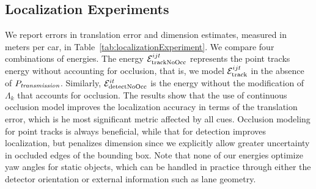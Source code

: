 \subsection{Localization Experiments}
We report errors in translation error and dimension estimates, measured in meters per car, in Table~\ref{tab:localizationExperiment}. We compare four combinations of energies.  The energy $\mathcal{E}^{ijt}_{\text{trackNoOcc}}$ represents the point tracks energy without accounting for occlusion, that is, we model $\mathcal{E}^{ijt}_{\text{track}}$ in the absence of $P_{\textit{transmission}}$. Similarly, $\mathcal{E}^{it}_{\text{detectNoOcc}}$ is the energy without the modification of $\Lambda_k$ that accounts for occlusion. The results show that the use of continuous occlusion model improves the localization accuracy in terms of the translation error, which is he most significant metric affected by all cues. Occlusion modeling for point tracks is always beneficial, while that for detection improves localization, but penalizes dimension since we explicitly allow greater uncertainty in occluded edges of the bounding box. Note that none of our energies optimize yaw angles for static objects, which can be handled in practice through either the detector orientation or external information such as lane geometry.




